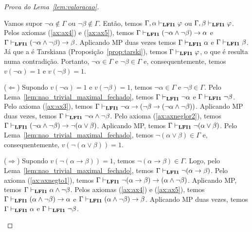 \begin{proof}[Prova do Lema~\ref{lem:valoracao}]
\begin{provaporcasos}
\begin{adjustwidth}{1cm}{}
                            \noindent Vamos supor $\neg \alpha \not \in \Gamma$ ou $\neg \beta \not \in \Gamma$. Então, temos $\Gamma, \alpha \vdash_{{\normalfont\textbf{LFI1}}{}} \varphi$ ou $\Gamma, \beta \vdash_{{\normalfont\textbf{LFI1}}{}} \varphi$. Pelos axiomas (\ref{ax:ax4}) e (\ref{ax:ax5}), temos $\Gamma \vdash_{{\normalfont\textbf{LFI1}}{}} (\neg \alpha \land \neg \beta) \to \alpha$ e $\Gamma \vdash_{{\normalfont\textbf{LFI1}}{}} (\neg \alpha \land \neg \beta) \to \beta$. Aplicando MP duas vezes temos $\Gamma \vdash_{{\normalfont\textbf{LFI1}}{}} \alpha$ e $\Gamma \vdash_{{\normalfont\textbf{LFI1}}{}} \beta$. Já que a \lfium{} é Tarskiana (Proposição~\ref{prop:tarski}), temos $\Gamma \vdash_{{\normalfont\textbf{LFI1}}{}} \varphi$, o que é resulta numa contradição. Portanto, $\neg \alpha \in \Gamma$ e $\neg \beta \in \Gamma$ e, consequentemente, temos $v(\neg \alpha) = 1$ e $v(\neg \beta) = 1$. 
                            
                            \noindent ($\Longleftarrow$) Supondo $v(\neg \alpha) = 1$ e $v(\neg \beta) = 1$, temos $\neg \alpha \in \Gamma$ e $\neg \beta \in \Gamma$. Pelo Lema~\ref{lem:nao_trivial_maximal_fechado}, temos $\Gamma \vdash_{{\normalfont\textbf{LFI1}}{}} \neg \alpha$ e $\Gamma \vdash_{{\normalfont\textbf{LFI1}}{}} \neg \beta$. Pelo axioma (\ref{ax:ax3}), temos $\Gamma \vdash_{{\normalfont\textbf{LFI1}}{}} \neg \alpha \to (\neg \beta \to (\neg \alpha \land \neg \beta))$. Aplicando MP duas vezes, temos $\Gamma \vdash_{{\normalfont\textbf{LFI1}}{}} \neg \alpha \land \neg \beta$. Pelo axioma (\ref{ax:axneglor2}), temos $\Gamma \vdash_{{\normalfont\textbf{LFI1}}{}} (\neg \alpha \land \neg \beta) \to \neg (\alpha \lor \beta)$. Aplicando MP, temos $\Gamma \vdash_{{\normalfont\textbf{LFI1}}{}} \neg (\alpha \lor \beta)$. Pelo Lema~\ref{lem:nao_trivial_maximal_fechado}, temos $\neg (\alpha \lor \beta) \in \Gamma$ e, consequentemente, $v(\neg (\alpha \lor \beta)) = 1$.

                        \end{adjustwidth}


                        \begin{adjustwidth}{1cm}{}
                            
                            \noindent ($\Longrightarrow$) Supondo $v(\neg (\alpha \to \beta)) = 1$, temos $\neg (\alpha \to \beta) \in \Gamma$. Logo, pelo Lema~\ref{lem:nao_trivial_maximal_fechado}, temos $\Gamma \vdash_{{\normalfont\textbf{LFI1}}{}} \neg (\alpha \to \beta)$. Pelo axioma (\ref{ax:axnegto1}), temos $\Gamma \vdash_{{\normalfont\textbf{LFI1}}{}} \neg (\alpha \to \beta) \to (\alpha \land \neg \beta)$. Aplicando MP, temos $\Gamma \vdash_{{\normalfont\textbf{LFI1}}{}} \alpha \land \neg \beta$. Pelos axiomas (\ref{ax:ax4}) e (\ref{ax:ax5}), temos $\Gamma \vdash_{{\normalfont\textbf{LFI1}}{}} (\alpha \land \neg \beta) \to \alpha$ e $\Gamma \vdash_{{\normalfont\textbf{LFI1}}{}} (\alpha \land \neg \beta) \to \beta$. Aplicando MP duas vezes, temos $\Gamma \vdash_{{\normalfont\textbf{LFI1}}{}} \alpha$ e $\Gamma \vdash_{{\normalfont\textbf{LFI1}}{}} \neg \beta$.


\end{adjustwidth}
\end{provaporcasos}
\end{proof}
